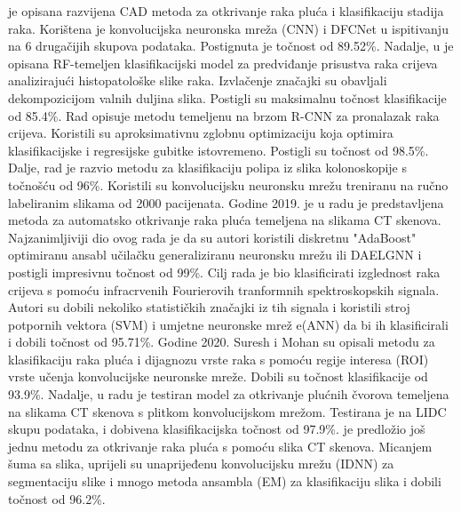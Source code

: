\documentclass[conference, utf8]{IEEEtran}
\begin{document}
je opisana razvijena CAD metoda za otkrivanje raka pluća i klasifikaciju stadija raka. Korištena je konvolucijska neuronska mreža (CNN) i DFCNet u ispitivanju na 6 drugačijih skupova podataka. Postignuta je točnost od 89.52\%. Nadalje, u \cite{babu2018colon} je opisana RF-temeljen klasifikacijski model za predviđanje prisustva raka crijeva analizirajući histopatološke slike raka. Izvlačenje značajki su obavljali dekompozicijom valnih duljina slika. Postigli su maksimalnu točnost klasifikacije od 85.4\%. Rad \cite{mo2018efficient} opisuje metodu temeljenu na brzom R-CNN za pronalazak raka crijeva. Koristili su aproksimativnu zglobnu optimizaciju koja optimira klasifikacijske i regresijske gubitke istovremeno. Postigli su točnost od 98.5\%. Dalje, rad \cite{urban2018deep} je razvio metodu za klasifikaciju polipa iz slika kolonoskopije s točnošću od 96\%. Koristili su konvolucijsku neuronsku mrežu treniranu na ručno labeliranim slikama od 2000 pacijenata. Godine 2019. je u radu \cite{shakeel2020automatic} je predstavljena metoda za automatsko otkrivanje raka pluća temeljena na slikama CT skenova. Najzanimljiviji dio ovog rada je da su autori koristili diskretnu "AdaBoost" optimiranu ansabl učilačku generaliziranu neuronsku mrežu ili DAELGNN i postigli impresivnu točnost od 99\%. Cilj rada \cite{toraman2019classification} je bio klasificirati izglednost raka crijeva s pomoću infracrvenih Fourierovih tranformnih spektroskopskih signala. Autori su dobili nekoliko statističkih značajki iz tih signala i koristili stroj potpornih vektora (SVM) i umjetne neuronske mrež e(ANN) da bi ih klasificirali i dobili točnost od 95.71\%. Godine 2020. Suresh i Mohan \cite{suresh2020roi} su opisali metodu za klasifikaciju raka pluća i dijagnozu vrste raka s pomoću regije interesa (ROI) vrste učenja konvolucijske neuronske mreže. Dobili su točnost klasifikacije od 93.9\%. Nadalje, u radu \cite{masud2020light} je testiran model za otkrivanje plućnih čvorova temeljena na slikama CT skenova s plitkom konvolucijskom mrežom. Testirana je na LIDC skupu podataka, i dobivena klasifikacijska točnost od 97.9\%. \cite{shakeel2022automatic} je predložio još jednu metodu za otkrivanje raka pluća s pomoću slika CT skenova. Micanjem šuma sa slika, uprijeli su unaprijeđenu konvolucijsku mrežu (IDNN) za segmentaciju slike i mnogo metoda ansambla (EM) za klasifikaciju slika i dobili točnost od 96.2\%.
	
\end{document}
